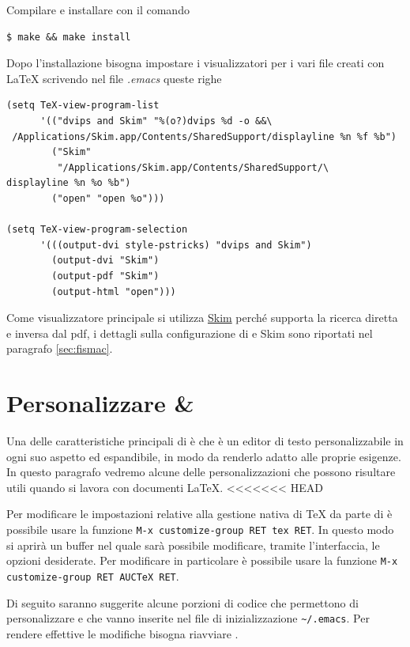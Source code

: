 \documentclass[11pt,a4paper]{article}
\begin{document}
Compilare e installare con il comando
\begin{Verbatim}
$ make && make install
\end{Verbatim}

Dopo l'installazione bisogna impostare i visualizzatori per i vari
file creati con \LaTeX{} scrivendo nel file \emph{.emacs} queste righe
\begin{Verbatim}
(setq TeX-view-program-list
      '(("dvips and Skim" "%(o?)dvips %d -o &&\
 /Applications/Skim.app/Contents/SharedSupport/displayline %n %f %b")
        ("Skim"
         "/Applications/Skim.app/Contents/SharedSupport/\
displayline %n %o %b")
        ("open" "open %o")))

(setq TeX-view-program-selection
      '(((output-dvi style-pstricks) "dvips and Skim")
        (output-dvi "Skim")
        (output-pdf "Skim")
        (output-html "open")))
\end{Verbatim}
Come visualizzatore principale si utilizza
\href{http://skim-app.sourceforge.net/}{Skim} perché supporta la
ricerca diretta e inversa dal pdf, i dettagli sulla configurazione di
\emacs{} e Skim sono riportati nel paragrafo \ref{sec:fismac}.

\section{Personalizzare \emacs{} \& \auctex} %
\label{sec:personal}

Una delle caratteristiche principali di \emacs{}
è che è un editor di testo personalizzabile in ogni suo aspetto ed espandibile,
in modo da renderlo adatto alle proprie esigenze.  In questo paragrafo vedremo
alcune delle personalizzazioni che possono risultare utili quando si lavora con
documenti \LaTeX{}.
<<<<<<< HEAD

Per modificare le impostazioni relative alla gestione nativa di \TeX{}
da parte di \emacs{}
è possibile usare la funzione \texttt{M-x customize-group RET tex RET}.  In
questo modo si aprirà un buffer nel quale sarà possibile modificare, tramite
l'interfaccia, le opzioni desiderate.  Per modificare in particolare \auctex{}
è possibile usare la funzione \texttt{M-x customize-group RET AUCTeX RET}.

Di seguito saranno suggerite alcune porzioni di codice che permettono di
personalizzare \emacs{}
e che vanno inserite nel file di inizializzazione
\texttt{\textasciitilde/.emacs}.  Per rendere effettive le modifiche bisogna
riavviare \emacs{}.
\end{document}
